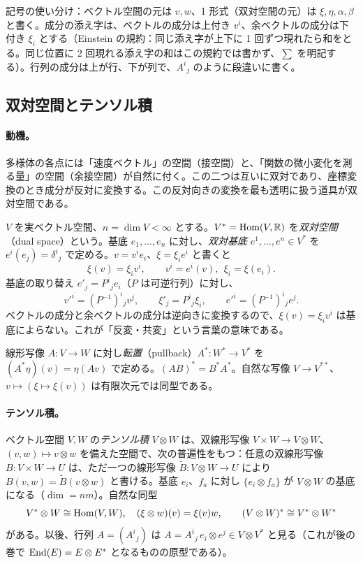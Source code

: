 記号の使い分け：ベクトル空間の元は $v,w$、1 形式（双対空間の元）は $\xi,\eta,\alpha,\beta$ と書く。成分の添え字は、ベクトルの成分は上付き $v^i$、余ベクトルの成分は下付き $\xi_i$ とする（Einstein の規約：同じ添え字が上下に 1 回ずつ現れたら和をとる。同じ位置に 2 回現れる添え字の和はこの規約では書かず、$\sum$ を明記する）。行列の成分は上が行、下が列で、$A^i{}_j$ のように段違いに書く。

\subsection{双対空間とテンソル積}
\paragraph{動機。}多様体の各点には「速度ベクトル」の空間（接空間）と、「関数の微小変化を測る量」の空間（余接空間）が自然に付く。この二つは互いに双対であり、座標変換のとき成分が反対に変換する。この反対向きの変換を最も透明に扱う道具が双対空間である。

$V$ を実ベクトル空間、$n=\dim V<\infty$ とする。$V^*=\mathrm{Hom}(V,\mathbb R)$ を\emph{双対空間}（dual space）という。基底 $e_1,\dots,e_n$ に対し、\emph{双対基底} $e^1,\dots,e^n\in V^*$ を $e^i(e_j)=\delta^i{}_j$ で定める。$v=v^ie_i$、$\xi=\xi_ie^i$ と書くと
\[
\xi(v)=\xi_iv^i,\qquad v^i=e^i(v),\ \ \xi_i=\xi(e_i).
\]
基底の取り替え $e'_j=P^i{}_je_i$（$P$ は可逆行列）に対し、
\begin{equation}\label{A:eq:basischange}
v'^i=(P^{-1})^i{}_jv^j,\qquad \xi'_j=P^i{}_j\xi_i,\qquad e'^i=(P^{-1})^i{}_je^j .
\end{equation}
ベクトルの成分と余ベクトルの成分は逆向きに変換するので、$\xi(v)=\xi_iv^i$ は基底によらない。これが「反変・共変」という言葉の意味である。

線形写像 $A:V\to W$ に対し\emph{転置}（pullback）$A^*:W^*\to V^*$ を $(A^*\eta)(v)=\eta(Av)$ で定める。$(AB)^*=B^*A^*$。自然な写像 $V\to V^{**}$、$v\mapsto(\xi\mapsto\xi(v))$ は有限次元では同型である。

\paragraph{テンソル積。}ベクトル空間 $V,W$ の\emph{テンソル積} $V\otimes W$ は、双線形写像 $V\times W\to V\otimes W$、$(v,w)\mapsto v\otimes w$ を備えた空間で、次の普遍性をもつ：任意の双線形写像 $B:V\times W\to U$ は、ただ一つの線形写像 $\tilde B:V\otimes W\to U$ により $B(v,w)=\tilde B(v\otimes w)$ と書ける。基底 $e_i$、$f_a$ に対し $\{e_i\otimes f_a\}$ が $V\otimes W$ の基底になる（$\dim=nm$）。自然な同型
\[
V^*\otimes W\cong\mathrm{Hom}(V,W),\quad (\xi\otimes w)(v)=\xi(v)w,\qquad (V\otimes W)^*\cong V^*\otimes W^*
\]
がある。以後、行列 $A=(A^i{}_j)$ は $A=A^i{}_j\,e_i\otimes e^j\in V\otimes V^*$ と見る（これが後の巻で $\mathrm{End}(E)=E\otimes E^*$ となるものの原型である）。

